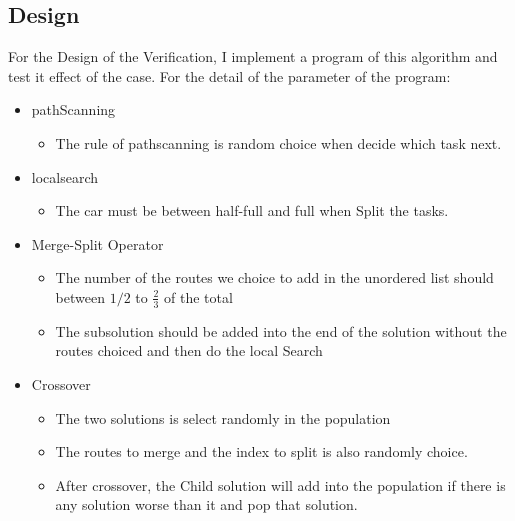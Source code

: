 \documentclass[conference,compsoc]{IEEEtran}
\begin{document}
  \subsection{Design}
    For the Design of the Verification, I implement a program of this algorithm and test it effect of the case.
    For the detail of the parameter of the program:
    \begin{itemize}
      \item pathScanning
        \begin{itemize}
          \item The rule of pathscanning is random choice when decide which task next.
        \end{itemize}
      \item localsearch
        \begin{itemize}
          \item The car must be between half-full and full when Split the tasks.
        \end{itemize}
      \item Merge-Split Operator
        \begin{itemize}
          \item The number of the routes we choice to add in the unordered list should between $1/2$ to $\frac{2}{3}$ of the total
          \item The subsolution should be added into the end of the solution without the routes choiced and then do the local Search
        \end{itemize}
      \item Crossover
      \begin{itemize}
        \item The two solutions is select randomly in the population
        \item The routes to merge and the index to split is also randomly choice.
        \item After crossover, the Child solution will add into the population if there is any solution worse than it and pop that solution.
      \end{itemize}
    \end{itemize}
\end{document}
